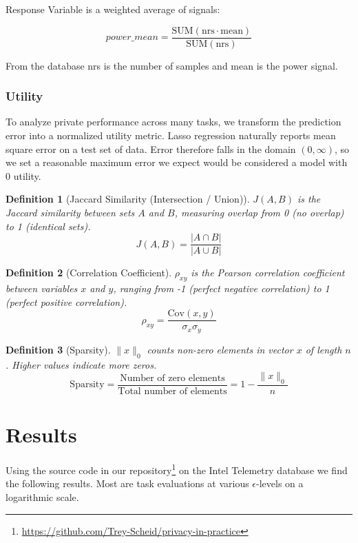 \documentclass[12pt,letterpaper]{article}
\newtheorem{definition}{Definition}
\begin{document}
Response Variable is a weighted average of signals:

\[power\_mean = \frac{\text{SUM}(\text{nrs} \cdot \text{mean})}{\text{SUM}(\text{nrs})}\]

From the database nrs is the number of samples and mean is the power signal. 

\subsubsection{Utility}

To analyze private performance across many tasks, we transform the prediction error into a normalized utility metric. Lasso regression naturally reports mean square error on a test set of data. Error therefore falls in the domain $(0, \infty)$, so we set a reasonable maximum error we expect would be considered a model with 0 utility. 

\begin{definition}[Jaccard Similarity (Intersection / Union)]
    \label{def:sim}
    $J(A, B)$ is the Jaccard similarity between sets $A$ and $B$, measuring overlap from 0 (no overlap) to 1 (identical sets).
    \[J(A, B) = \frac{|A \cap B|}{|A \cup B|} \]
\end{definition}

\begin{definition}[Correlation Coefficient]
    \label{def:r2}
    $\rho_{xy}$ is the Pearson correlation coefficient between variables $x$ and $y$, ranging from -1 (perfect negative correlation) to 1 (perfect positive correlation).
    \[\rho_{xy} = \frac{\text{Cov}(x,y)}{\sigma_x \sigma_y}\]
\end{definition}

\begin{definition}[Sparsity]
    \label{def:sparsity}
    $\|x\|_0$ counts non-zero elements in vector $x$ of length $n$. Higher values indicate more zeros.
    \[\text{Sparsity} = \frac{\text{Number of zero elements}}{\text{Total number of elements}} = 1 - \frac{\|x\|_0}{n}\]
\end{definition}


\section{Results}

Using the source code in our repository\footnote{\url{https://github.com/Trey-Scheid/privacy-in-practice}} on the Intel Telemetry database we find the following results. Most are task evaluations at various $\epsilon$-levels on a logarithmic scale.
\end{document}
